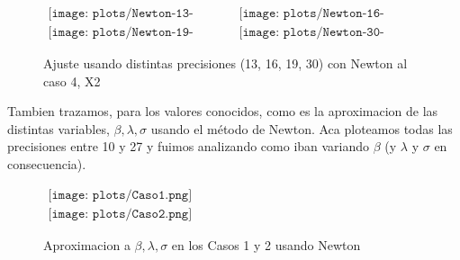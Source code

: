 \begin{figure} [H]
$\begin{array}{cc}
\texttt{[image: plots/Newton-13-caso4.png]} &
\texttt{[image: plots/Newton-16-caso4.png]} \\
\texttt{[image: plots/Newton-19-caso4.png]} &
\texttt{[image: plots/Newton-30-caso4.png]}
\end{array}$
\caption{Ajuste usando distintas precisiones (13, 16, 19, 30) con Newton al caso 4, X2}
\label{fig:FitCaso4Newton}
\end{figure}


Tambien trazamos, para los valores conocidos, como es la aproximacion de las distintas variables, $\beta, \lambda, \sigma$ usando el m\'etodo de Newton.
Aca ploteamos todas las precisiones entre 10 y 27 y fuimos analizando como iban variando $\beta$ (y $\lambda$ y $\sigma$ en consecuencia).


\begin{figure}
$\begin{array}{c}
\texttt{[image: plots/Caso1.png]} \\
\texttt{[image: plots/Caso2.png]}
\end{array}$

\caption{Aproximacion a $\beta, \lambda, \sigma$ en los Casos 1 y 2 usando Newton}
\label{fig:AproxCaso1}
\end{figure}


